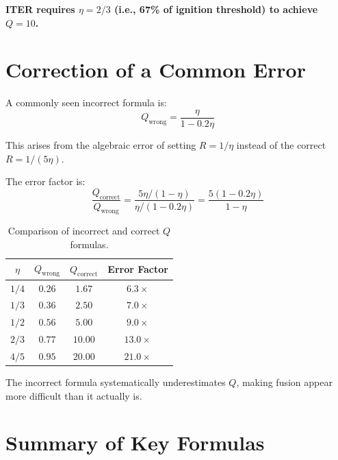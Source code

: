 \documentclass[11pt,a4paper]{article}
\begin{document}
\textbf{ITER requires $\eta = 2/3$ (i.e., 67\% of ignition threshold) to achieve $Q = 10$.}

\section{Correction of a Common Error}

A commonly seen incorrect formula is:
\begin{equation}
Q_{\text{wrong}} = \frac{\eta}{1 - 0.2\eta}
\label{eq:Q_wrong}
\end{equation}

This arises from the algebraic error of setting $R = 1/\eta$ instead of the correct $R = 1/(5\eta)$.

The error factor is:
\begin{equation}
\frac{Q_{\text{correct}}}{Q_{\text{wrong}}} = \frac{5\eta/(1-\eta)}{\eta/(1-0.2\eta)} = \frac{5(1-0.2\eta)}{1-\eta}
\end{equation}

\begin{table}[h]
\centering
\begin{tabular}{|c|c|c|c|}
\hline
$\eta$ & $Q_{\text{wrong}}$ & $Q_{\text{correct}}$ & Error Factor \\
\hline
$1/4$ & $0.26$ & $1.67$ & $6.3\times$ \\
$1/3$ & $0.36$ & $2.50$ & $7.0\times$ \\
$1/2$ & $0.56$ & $5.00$ & $9.0\times$ \\
$2/3$ & $0.77$ & $10.00$ & $13.0\times$ \\
$4/5$ & $0.95$ & $20.00$ & $21.0\times$ \\
\hline
\end{tabular}
\caption{Comparison of incorrect and correct $Q$ formulas.}
\label{tab:error}
\end{table}

The incorrect formula systematically underestimates $Q$, making fusion appear more difficult than it actually is.

\section{Summary of Key Formulas}
\end{document}
